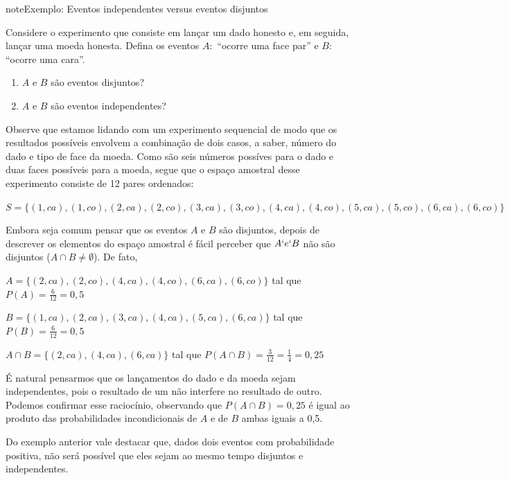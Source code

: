 \begin{sphinxadmonition}{note}{Exemplo: Eventos independentes versus eventos disjuntos}

Considere o experimento que consiste em lançar um dado honesto e, em seguida, lançar uma moeda honesta. Defina os eventos \(A:\) “ocorre uma face par” e \(B:\) “ocorre uma cara”.
\begin{enumerate}
\item {} 
\(A\) e \(B\) são eventos disjuntos?

\item {} 
\(A\) e \(B\) são eventos independentes?

\end{enumerate}

Observe que estamos lidando com um experimento sequencial de modo que os resultados possíveis envolvem a combinação de dois casos, a saber, número do dado e tipo de face da moeda. Como são seis números possíves para o dado e duas faces possíveis para a moeda, segue que o espaço amostral desse experimento consiste de 12 pares ordenados:

\(S=\{(1,ca),(1,co),(2,ca),(2,co),(3,ca),(3,co),(4,ca),(4,co),(5,ca),(5,co),(6,ca),(6,co)\}\)

Embora seja comum pensar que os eventos \(A\) e \(B\) são disjuntos, depois de descrever os elementos do espaço amostral é fácil perceber que \(A`e  `B\) não são disjuntos (\(A\cap B\neq \emptyset\)). De fato,

\(A=\{(2,ca),(2,co),(4,ca),(4,co),(6,ca),(6,co)\}\) tal que \(P(A)=\frac{6}{12}=0,5\)

\(B=\{(1,ca),(2,ca),(3,ca),(4,ca),(5,ca),(6,ca)\}\) tal que \(P(B)=\frac{6}{12}=0,5\)

\(A\cap B=\{(2,ca),(4,ca),(6,ca)\}\) tal que \(P(A\cap B)=\frac{3}{12}=\frac{1}{4}=0,25\)

É natural pensarmos que os lançamentos do dado e da moeda sejam independentes, pois o resultado de um não interfere no resultado de outro. Podemos confirmar esse raciocínio, observando que \(P(A\cap B)=0,25\) é igual ao produto das probabilidades incondicionais de \(A\) e de \(B\)  ambas iguais a 0,5.
\end{sphinxadmonition}

Do exemplo anterior vale destacar que, dados dois eventos com probabilidade positiva, não será possível que eles sejam ao mesmo tempo disjuntos e independentes.

